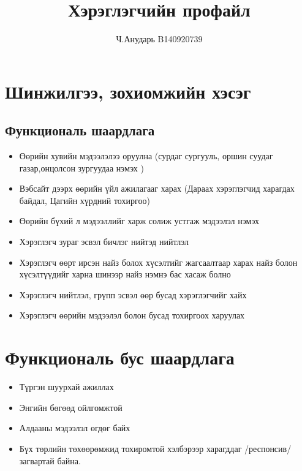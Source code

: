 \documentclass[]{article}
\title{Хэрэглэгчийн профайл}
\author{Ч.Анударь B140920739}
\begin{document}
	\maketitle
	
	\newpage
	\section{Шинжилгээ, зохиомжийн хэсэг}
	\subsection{Функциональ шаардлага}
	\begin{itemize}
		\item Өөрийн хувийн мэдээлэлээ оруулна  (сурдаг сургууль, оршин суудаг газар,онцолсон зургуудаа нэмэх )
		\item Вэбсайт дээрх өөрийн үйл ажилагааг харах (Дараах хэрэглэгчид харагдах байдал, Цагийн хүрдний тохиргоо)
		\item Өөрийн бүхий л мэдээллийг харж солиж устгаж мэдээлэл нэмэх 
		\item Хэрэглэгч зураг эсвэл бичлэг нийтэд нийтлэл
		\item Хэрэглэгч өөрт ирсэн найз болох хүсэлтийг жагсаалтаар харах найз болон хүсэлтүүдийг харна шинээр найз нэмнэ бас хасаж болно
		\item Хэрэглэгч нийтлэл, грүпп эсвэл өөр бусад хэрэглэгчийг хайх
		\item Хэрэглэгч өөрийн мэдээлэл болон бусад тохиргоох харуулах
	\end{itemize}
	\section{Функциональ бус шаардлага}
	\begin{itemize}
		\item Түргэн шуурхай ажиллах
		\item Энгийн бөгөөд ойлгомжтой 
		\item Алдааны мэдээлэл өгдөг байх 
		\item Бүх төрлийн төхөөрөмжид тохиромтой хэлбэрээр харагддаг /респонсив/ загвартай байна.
	\end{itemize}
\end{document}
